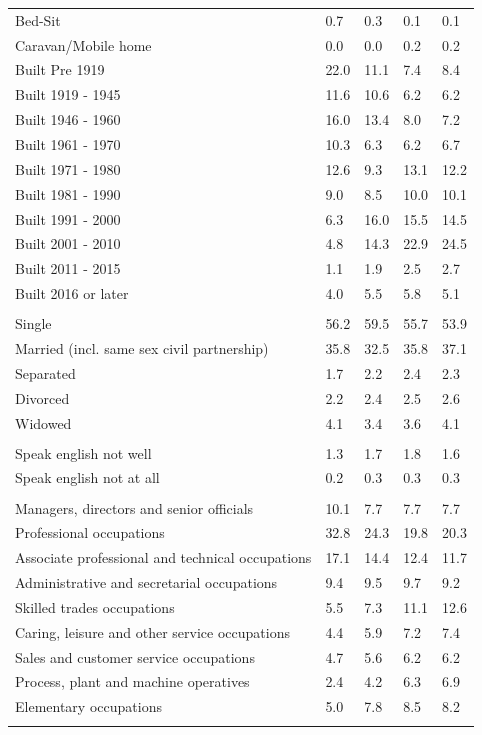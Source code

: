 \documentclass{article}
\begin{document}
\begin{table}[h]
\begin{tabular}{KTTTT}
Bed-Sit & 0.7& 0.3& 0.1& 0.1\\
Caravan/Mobile home & 0.0& 0.0& 0.2& 0.2\\
    \hline
Built Pre 1919 & 22.0& 11.1&  7.4&  8.4\\
Built 1919 - 1945 & 11.6& 10.6&  6.2&  6.2\\
Built  1946 - 1960 & 16.0& 13.4&  8.0&  7.2\\
Built  1961 - 1970 & 10.3&  6.3&  6.2&  6.7\\
Built  1971 - 1980 & 12.6&  9.3& 13.1& 12.2\\
Built  1981 - 1990 &  9.0&  8.5& 10.0& 10.1\\
Built  1991 - 2000 &  6.3& 16.0& 15.5& 14.5\\
Built  2001 - 2010 &  4.8& 14.3& 22.9& 24.5\\
Built  2011 - 2015 & 1.1& 1.9& 2.5& 2.7\\
Built  2016 or later & 4.0& 5.5& 5.8& 5.1\\
\hline
    \\
    \hline
Single & 56.2& 59.5& 55.7& 53.9\\
Married (incl. same sex civil partnership) & 35.8& 32.5& 35.8& 37.1\\
Separated  & 1.7& 2.2& 2.4& 2.3\\
Divorced  & 2.2& 2.4& 2.5& 2.6\\
Widowed & 4.1& 3.4& 3.6& 4.1\\
\hline
    \\ 
    \hline
Speak english not well & 1.3& 1.7& 1.8& 1.6\\
Speak english not at all & 0.2& 0.3& 0.3& 0.3\\
\hline
    \\
    \hline
Managers, directors and senior officials & 10.1&  7.7&  7.7&  7.7\\
Professional occupations & 32.8& 24.3& 19.8& 20.3\\
Associate professional and technical occupations & 17.1& 14.4& 12.4& 11.7\\
Administrative and secretarial occupations & 9.4& 9.5& 9.7& 9.2\\
Skilled trades occupations &  5.5&  7.3& 11.1& 12.6\\
Caring, leisure and other service occupations & 4.4& 5.9& 7.2& 7.4\\
Sales and customer service occupations & 4.7& 5.6& 6.2& 6.2\\
Process, plant and machine operatives & 2.4& 4.2& 6.3& 6.9\\
Elementary occupations & 5.0& 7.8& 8.5& 8.2\\
\hline
\end{tabular}
\end{table}
\end{document}

